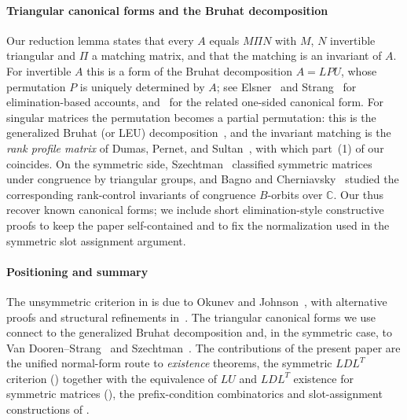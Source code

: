 \documentclass[preprint,12pt]{elsarticle}
\theoremstyle{plain}
\theoremstyle{nonumberplain}
\numberwithin{equation}{section}
\numberwithin{theorem}{section}
\begin{document}
\paragraph{Triangular canonical forms and the Bruhat decomposition}
Our reduction lemma states that every $A$ equals $M \Pi N$ with $M$, $N$ invertible triangular and $\Pi$ a matching matrix, and that the matching is an invariant of $A$.  For invertible $A$ this is a form of the Bruhat decomposition $A = LPU$, whose permutation $P$ is uniquely determined by $A$; see Elsner~\cite{elsner_bruhat_1979} and Strang~\cite{strang_pnas_2010,strang_lpu_2012} for elimination-based accounts, and~\cite{dopico_multiple_2006} for the related one-sided canonical form.  For singular matrices the permutation becomes a partial permutation: this is the generalized Bruhat (or LEU) decomposition~\cite{malaschonok_2010}, and the invariant matching is the \emph{rank profile matrix} of Dumas, Pernet, and Sultan~\cite{dumas_pernet_sultan_2017}, with which part~(1) of our  coincides.  On the symmetric side, Szechtman~\cite{szechtman_2007} classified symmetric matrices under congruence by triangular groups, and Bagno and Cherniavsky~\cite{bagno_cherniavsky_2012} studied the corresponding rank-control invariants of congruence $B$-orbits over $\mathbb{C}$.  Our  thus recover known canonical forms; we include short elimination-style constructive proofs to keep the paper self-contained and to fix the normalization used in the symmetric slot assignment argument.

\paragraph{Positioning and summary}
The unsymmetric criterion in  is due to Okunev and Johnson~\cite{okunev_johnson_2005,johnson_okunev_2025}, with alternative proofs and structural refinements in~\cite{darve_lu_2026}. The triangular canonical forms we use connect to the generalized Bruhat decomposition \cite{elsner_bruhat_1979,malaschonok_2010,dumas_pernet_sultan_2017} and, in the symmetric case, to Van Dooren--Strang~\cite{vandooren_strang_2014} and Szechtman~\cite{szechtman_2007}.  The contributions of the present paper are the unified normal-form route to \emph{existence} theorems, the symmetric $LDL^T$ criterion () together with the equivalence of $LU$ and $LDL^T$ existence for symmetric matrices (), the prefix-condition combinatorics and slot-assignment constructions of .
\end{document}
